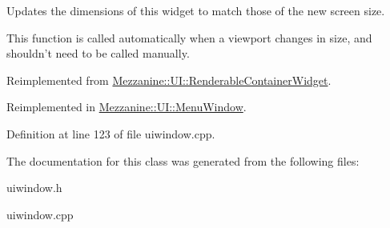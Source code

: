 Updates the dimensions of this widget to match those of the new screen size. 

This function is called automatically when a viewport changes in size, and shouldn't need to be called manually. 

Reimplemented from \hyperlink{classMezzanine_1_1UI_1_1RenderableContainerWidget_acfea936d03f85a2e6d289e50844d6b11}{Mezzanine::UI::RenderableContainerWidget}.



Reimplemented in \hyperlink{classMezzanine_1_1UI_1_1MenuWindow_a9100422fa989e3c3d41e9b22046773f7}{Mezzanine::UI::MenuWindow}.



Definition at line 123 of file uiwindow.cpp.



The documentation for this class was generated from the following files:\begin{DoxyCompactItemize}
\item 
uiwindow.h\item 
uiwindow.cpp\end{DoxyCompactItemize}
